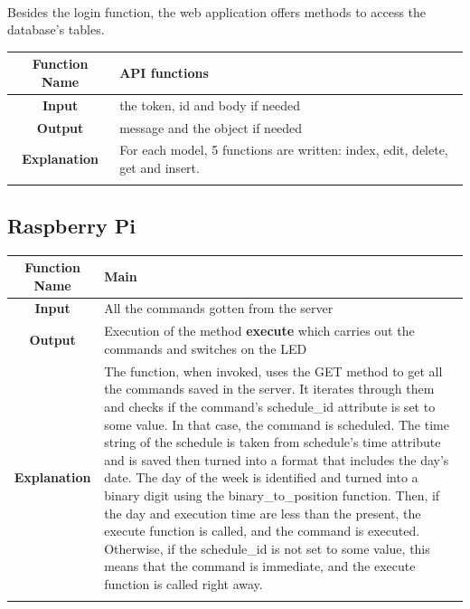 \documentclass[12pt, oneside, a4paper]{book}
\newcommand\boldcolor[1]{\textcolor{bold}{\textbf{#1}}}
\newcommand\Includegraphics[2][]{\addvbuffer[3pt 0pt]{\texttt{[image: \#2]}}}
\begin{document}
		\paragraph{} Besides the login function, the web application offers methods to access the database's tables. 
		\begin{table}[H]
			\begin{center}
				\begin{tabularx}{\linewidth}{|c|X|}\hline
					\boldcolor{Function Name} & \textbf{API functions} \\\hline
					\boldcolor{Input} & the token, id and body if needed\\\hline
					\boldcolor{Output} & message and the object if needed\\\hline
					\boldcolor{Explanation} & For each model, 5 functions are written: index, edit, delete, get and insert. \\\hline
					\multicolumn{2}{|c|}{\Includegraphics[width=.5\linewidth]{img/code_api.png}}
					\\\hline
				\end{tabularx}
			\end{center}
		\end{table}
					
		\subsection{Raspberry Pi}			
		\begin{table}[H]
			\begin{center}
				\begin{tabularx}{\linewidth}{|c|X|}\hline
					\boldcolor{Function Name} & \textbf{Main} \\\hline
					\boldcolor{Input} & All the commands gotten from the server\\\hline
					\boldcolor{Output} & Execution of the method \textbf{execute} which carries out the commands and switches on the LED \\\hline
					\boldcolor{Explanation} & The function, when invoked, uses the GET method to get all the commands saved in the server. It iterates through them and checks if the command’s schedule\_id attribute is set to some value. In that case, the command is scheduled. The time string of the schedule is taken from schedule’s time attribute and is saved then turned into a format that includes the day’s date. The day of the week is identified and turned into a binary digit using the binary\_to\_position function. Then, if the day and execution time are less than the present, the execute function is called, and the command is executed. Otherwise, if the schedule\_id is not set to some value, this means that the command is immediate, and the execute function is called right away.  \\\hline
					\multicolumn{2}{|c|}{\Includegraphics[width=.5\linewidth]{img/code_main.png}}
					\\\hline
				\end{tabularx}
			\end{center}
		\end{table}
		
\end{document}
